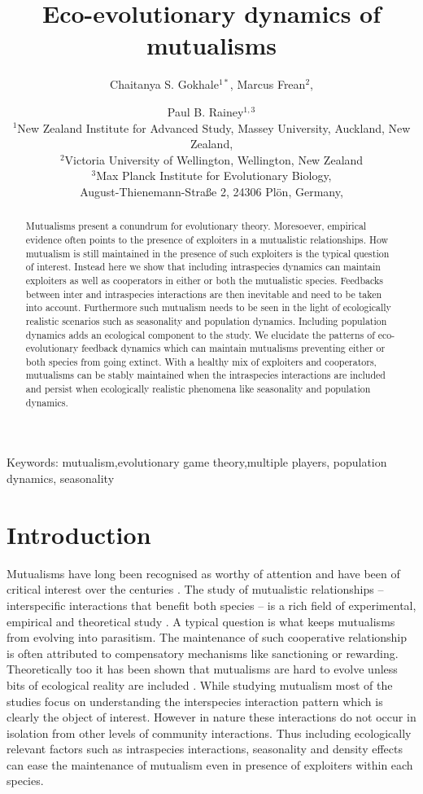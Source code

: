 \documentclass[12pt]{article}
\title{\vspace*{-22mm}\bf Eco-evolutionary dynamics of mutualisms}
\author{Chaitanya S. Gokhale$^{1*}$,
Marcus Frean$^{2}$,
 \and Paul B. Rainey$^{1,3}$ \\
\normalsize $^{1}$New Zealand Institute for Advanced Study, Massey University, Auckland, New Zealand, \\
\normalsize $^2$Victoria University of Wellington, Wellington, New Zealand\\
\normalsize $^3$Max Planck Institute for Evolutionary Biology, \\
\normalsize August-Thienemann-Stra{\ss}e 2, 24306 Pl\"{o}n, Germany,\\
}
\date{}
\begin{document}
\maketitle

\begin{abstract}
Mutualisms present a conundrum for evolutionary theory.
Moresoever, empirical evidence often points to the presence of exploiters in a mutualistic relationships.
How mutualism is still maintained in the presence of such exploiters is the typical question of interest.
Instead here we show that including intraspecies dynamics can maintain exploiters as well as cooperators in either or both the mutualistic species.
Feedbacks between inter and intraspecies interactions are then inevitable and need to be taken into account.
Furthermore such mutualism needs to be seen in the light of ecologically realistic scenarios such as seasonality and population dynamics. 
Including population dynamics adds an ecological component to the study.
We elucidate the patterns of eco-evolutionary feedback dynamics which can maintain mutualisms preventing either or both species from going extinct.
With a healthy mix of exploiters and cooperators, mutualisms can be stably maintained when the intraspecies interactions are included and persist when ecologically realistic phenomena like seasonality and population dynamics.
\end{abstract}

\noindent
Keywords: mutualism,evolutionary game theory,multiple players, population dynamics, seasonality

\tableofcontents

\section{Introduction}
Mutualisms have long been recognised as worthy of attention and have been of critical interest over the centuries \citep{aristotle:book:350,janzen:bookchapter:1985,bronstein:book:2003}.
The study of mutualistic relationships -- interspecific interactions that benefit both species -- is a rich field of experimental, empirical and theoretical study 
\citep{boucher:book:1985,hinton:PTENHS:1951,wilson:AmNat:1983,bronstein:QRB:1994,poulin:JTB:1995,noe:book:2001,johnstone:ECL:2002,pierce:ARE:2002,kiers:Nature:2003,bergstrom:PNAS:2003,hoeksema:AmNat:2003,bshary:ASB:2004,akcay:PRSB:2007,bshary:Nature:2008,gokhale:PRSB:2012,archetti:JTB:2013}.
A typical question is what keeps mutualisms from evolving into parasitism.
The maintenance of such cooperative relationship is often attributed to compensatory mechanisms like sanctioning or rewarding.
Theoretically too it has been shown that mutualisms are hard to evolve unless bits of ecological reality are included \cite{doebeli:PNAS:1998}.
While studying mutualism most of the studies focus on understanding the interspecies interaction pattern which is clearly the object of interest.
However in nature these interactions do not occur in isolation from other levels of community interactions.
Thus including ecologically relevant factors such as intraspecies interactions, seasonality and density effects can ease the maintenance of mutualism even in presence of exploiters within each species. 
\end{document}
